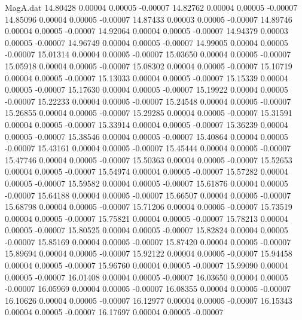 \begin{filecontents}{MagA.dat}
  14.80428    0.00004    0.00005   -0.00007
  14.82762    0.00004    0.00005   -0.00007
  14.85096    0.00004    0.00005   -0.00007
  14.87433    0.00003    0.00005   -0.00007
  14.89746    0.00004    0.00005   -0.00007
  14.92064    0.00004    0.00005   -0.00007
  14.94379    0.00003    0.00005   -0.00007
  14.96749    0.00004    0.00005   -0.00007
  14.99005    0.00004    0.00005   -0.00007
  15.01314    0.00004    0.00005   -0.00007
  15.03650    0.00004    0.00005   -0.00007
  15.05918    0.00004    0.00005   -0.00007
  15.08302    0.00004    0.00005   -0.00007
  15.10719    0.00004    0.00005   -0.00007
  15.13033    0.00004    0.00005   -0.00007
  15.15339    0.00004    0.00005   -0.00007
  15.17630    0.00004    0.00005   -0.00007
  15.19922    0.00004    0.00005   -0.00007
  15.22233    0.00004    0.00005   -0.00007
  15.24548    0.00004    0.00005   -0.00007
  15.26855    0.00004    0.00005   -0.00007
  15.29285    0.00004    0.00005   -0.00007
  15.31591    0.00004    0.00005   -0.00007
  15.33914    0.00004    0.00005   -0.00007
  15.36239    0.00004    0.00005   -0.00007
  15.38546    0.00004    0.00005   -0.00007
  15.40864    0.00004    0.00005   -0.00007
  15.43161    0.00004    0.00005   -0.00007
  15.45444    0.00004    0.00005   -0.00007
  15.47746    0.00004    0.00005   -0.00007
  15.50363    0.00004    0.00005   -0.00007
  15.52653    0.00004    0.00005   -0.00007
  15.54974    0.00004    0.00005   -0.00007
  15.57282    0.00004    0.00005   -0.00007
  15.59582    0.00004    0.00005   -0.00007
  15.61876    0.00004    0.00005   -0.00007
  15.64188    0.00004    0.00005   -0.00007
  15.66507    0.00004    0.00005   -0.00007
  15.68798    0.00004    0.00005   -0.00007
  15.71206    0.00004    0.00005   -0.00007
  15.73519    0.00004    0.00005   -0.00007
  15.75821    0.00004    0.00005   -0.00007
  15.78213    0.00004    0.00005   -0.00007
  15.80525    0.00004    0.00005   -0.00007
  15.82824    0.00004    0.00005   -0.00007
  15.85169    0.00004    0.00005   -0.00007
  15.87420    0.00004    0.00005   -0.00007
  15.89694    0.00004    0.00005   -0.00007
  15.92122    0.00004    0.00005   -0.00007
  15.94458    0.00004    0.00005   -0.00007
  15.96760    0.00004    0.00005   -0.00007
  15.99090    0.00004    0.00005   -0.00007
  16.01408    0.00004    0.00005   -0.00007
  16.03650    0.00004    0.00005   -0.00007
  16.05969    0.00004    0.00005   -0.00007
  16.08355    0.00004    0.00005   -0.00007
  16.10626    0.00004    0.00005   -0.00007
  16.12977    0.00004    0.00005   -0.00007
  16.15343    0.00004    0.00005   -0.00007
  16.17697    0.00004    0.00005   -0.00007

\end{filecontents}
